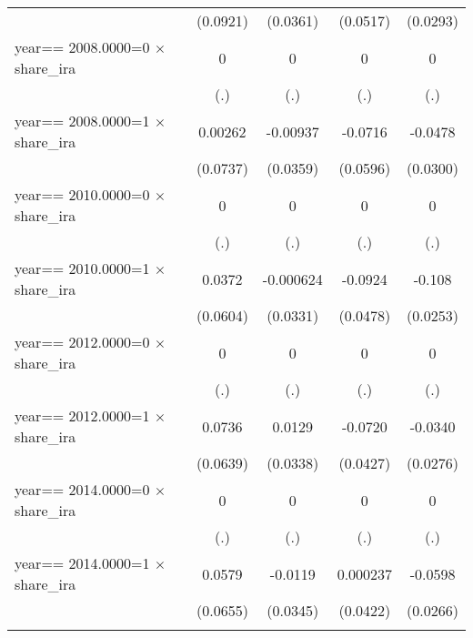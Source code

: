 \begin{table}[htbp]
\begin{tabular}{l*{4}{c}}
                & (0.0921)         & (0.0361)         & (0.0517)         & (0.0293)         \\
\addlinespace
year==  2008.0000=0 $\times$ share\_ira&        0         &        0         &        0         &        0         \\
                &      (.)         &      (.)         &      (.)         &      (.)         \\
\addlinespace
year==  2008.0000=1 $\times$ share\_ira&  0.00262         & -0.00937         &  -0.0716         &  -0.0478         \\
                & (0.0737)         & (0.0359)         & (0.0596)         & (0.0300)         \\
\addlinespace
year==  2010.0000=0 $\times$ share\_ira&        0         &        0         &        0         &        0         \\
                &      (.)         &      (.)         &      (.)         &      (.)         \\
\addlinespace
year==  2010.0000=1 $\times$ share\_ira&   0.0372         &-0.000624         &  -0.0924\sym{*}  &   -0.108\sym{***}\\
                & (0.0604)         & (0.0331)         & (0.0478)         & (0.0253)         \\
\addlinespace
year==  2012.0000=0 $\times$ share\_ira&        0         &        0         &        0         &        0         \\
                &      (.)         &      (.)         &      (.)         &      (.)         \\
\addlinespace
year==  2012.0000=1 $\times$ share\_ira&   0.0736         &   0.0129         &  -0.0720\sym{*}  &  -0.0340         \\
                & (0.0639)         & (0.0338)         & (0.0427)         & (0.0276)         \\
\addlinespace
year==  2014.0000=0 $\times$ share\_ira&        0         &        0         &        0         &        0         \\
                &      (.)         &      (.)         &      (.)         &      (.)         \\
\addlinespace
year==  2014.0000=1 $\times$ share\_ira&   0.0579         &  -0.0119         & 0.000237         &  -0.0598\sym{**} \\
                & (0.0655)         & (0.0345)         & (0.0422)         & (0.0266)         \\
\addlinespace

\end{tabular}
\end{table}
